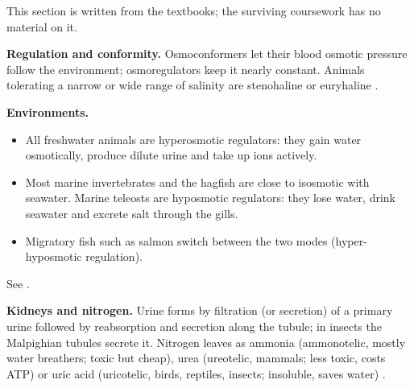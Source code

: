This section is written from the
textbooks; the surviving coursework has no
material on it.

\textbf{Regulation and conformity.}
Osmoconformers let their blood osmotic
pressure follow the environment;
osmoregulators keep it nearly constant.
Animals tolerating a narrow or wide range
of salinity are stenohaline or euryhaline
\cite[Chapter 27]{hill2012animal}.

\textbf{Environments.}
\begin{itemize}
\item All freshwater animals are
hyperosmotic regulators: they gain water
osmotically, produce dilute urine and
take up ions actively.
\item Most marine invertebrates and the
hagfish are close to isosmotic with
seawater. Marine teleosts are hyposmotic
regulators: they lose water, drink
seawater and excrete salt through the
gills.
\item Migratory fish such as salmon
switch between the two modes
(hyper-hyposmotic regulation).
\end{itemize}
See \cite[Chapter 28]{hill2012animal}.

\textbf{Kidneys and nitrogen.}
Urine forms by filtration (or secretion)
of a primary urine followed by
reabsorption and secretion along the
tubule; in insects the Malpighian tubules
secrete it. Nitrogen leaves as ammonia
(ammonotelic, mostly water breathers; toxic
but cheap), urea (ureotelic, mammals;
less toxic, costs ATP) or uric acid
(uricotelic, birds, reptiles, insects;
insoluble, saves water)
\cite[Chapter 29]{hill2012animal}.






